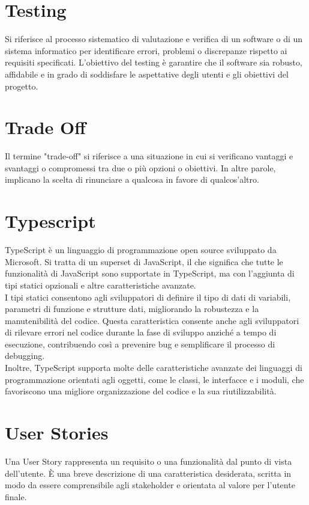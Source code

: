 \documentclass{article}
\begin{document}
\section{Testing}
Si riferisce al processo sistematico di valutazione e verifica di un software o di un sistema informatico per identificare errori, problemi o discrepanze rispetto ai requisiti specificati. L'obiettivo del testing è garantire che il software sia robusto, affidabile e in grado di soddisfare le aspettative degli utenti e gli obiettivi del progetto.

\section{Trade Off}
Il termine "trade-off" si riferisce a una situazione in cui si verificano vantaggi e svantaggi o compromessi tra due o più opzioni o obiettivi. In altre parole, implicano la scelta di rinunciare a qualcosa in favore di qualcos'altro.

\section{Typescript}
TypeScript è un linguaggio di programmazione open source sviluppato da Microsoft. Si tratta di un superset di JavaScript, il che significa che tutte le funzionalità di JavaScript sono supportate in TypeScript, ma con l'aggiunta di tipi statici opzionali e altre caratteristiche avanzate.\\
I tipi statici consentono agli sviluppatori di definire il tipo di dati di variabili, parametri di funzione e strutture dati, migliorando la robustezza e la manutenibilità del codice. Questa caratteristica consente anche agli sviluppatori di rilevare errori nel codice durante la fase di sviluppo anziché a tempo di esecuzione, contribuendo così a prevenire bug e semplificare il processo di debugging.\\
Inoltre, TypeScript supporta molte delle caratteristiche avanzate dei linguaggi di programmazione orientati agli oggetti, come le classi, le interfacce e i moduli, che favoriscono una migliore organizzazione del codice e la sua riutilizzabilità.

\section{User Stories}
Una User Story rappresenta un requisito o una funzionalità dal punto di vista dell'utente. È una breve descrizione di una caratteristica desiderata, scritta in modo da essere comprensibile agli stakeholder e orientata al valore per l'utente finale.
\end{document}
